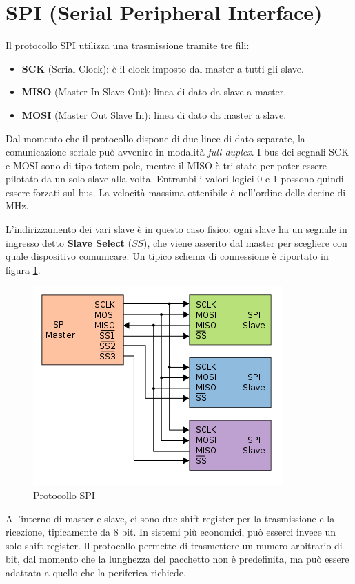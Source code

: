 \documentclass[11pt,4paper]{report}
\begin{document}
\section{SPI (Serial Peripheral Interface)}
Il protocollo SPI utilizza una trasmissione tramite tre fili:
\begin{itemize}
		\item \textbf{SCK} (Serial Clock): è il clock imposto dal master a tutti gli slave.
		\item \textbf{MISO} (Master In Slave Out): linea di dato da slave a master.
		\item \textbf{MOSI} (Master Out Slave In): linea di dato da master a slave.
\end{itemize}
Dal momento che il protocollo dispone di due linee di dato separate, la comunicazione seriale può avvenire in modalità \emph{full-duplex}. I bus dei segnali SCK e MOSI sono di tipo totem pole, mentre il MISO è tri-state per poter essere pilotato da un solo slave alla volta. Entrambi i valori logici 0 e 1 possono quindi essere forzati sul bus. La velocità massima ottenibile è nell'ordine delle decine di \si{\mega\hertz}.

L'indirizzamento dei vari slave è in questo caso fisico: ogni slave ha un segnale in ingresso detto \textbf{Slave Select} ($\overline{SS}$), che viene asserito dal master per scegliere con quale dispositivo comunicare. Un tipico schema di connessione è riportato in figura \ref{fig:spi_blocks}.
\begin{figure}[hbtp]
	\centering
	\includegraphics[width=0.5\linewidth]{seriali/spi_blocks.png}
	\caption{Protocollo SPI}
	\label{fig:spi_blocks}
\end{figure}

All'interno di master e slave, ci sono due shift register per la trasmissione e la ricezione, tipicamente da 8 bit. In sistemi più economici, può esserci invece un solo shift register. Il protocollo permette di trasmettere un numero arbitrario di bit, dal momento che la lunghezza del pacchetto non è predefinita, ma può essere adattata a quello che la periferica richiede.
\end{document}
